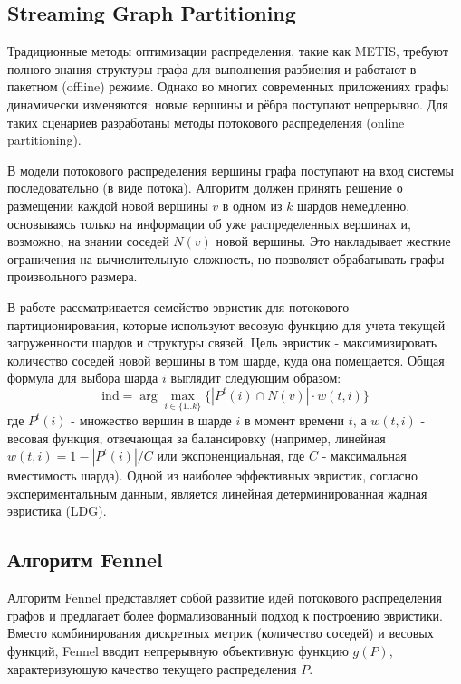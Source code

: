 \subsection{Streaming Graph Partitioning}

Традиционные методы оптимизации распределения, такие как METIS, требуют полного знания структуры графа для выполнения разбиения и работают в пакетном (offline) режиме. Однако во многих современных приложениях графы динамически изменяются: новые вершины и рёбра поступают непрерывно. Для таких сценариев разработаны методы потокового распределения (online partitioning).

В модели потокового распределения \cite{SGP} вершины графа поступают на вход системы последовательно (в виде потока). Алгоритм должен принять решение о размещении каждой новой вершины \(v\) в одном из \(k\) шардов немедленно, основываясь только на информации об уже распределенных вершинах и, возможно, на знании соседей \(N(v)\) новой вершины. Это накладывает жесткие ограничения на вычислительную сложность, но позволяет обрабатывать графы произвольного размера.

В работе \cite{SGP} рассматривается семейство эвристик для потокового партиционирования, которые используют весовую функцию для учета текущей загруженности шардов и структуры связей. Цель эвристик - максимизировать количество соседей новой вершины в том шарде, куда она помещается. Общая формула для выбора шарда \(i\) выглядит следующим образом:
$$
\text{ind} = \arg\max_{i \in \{1..k\}} \{ |P^t(i) \cap N(v)| \cdot w(t, i) \}
$$
где \(P^t(i)\) - множество вершин в шарде \(i\) в момент времени \(t\), а \(w(t, i)\) - весовая функция, отвечающая за балансировку (например, линейная \(w(t, i) = 1 - |P^t(i)| / C\) или экспоненциальная, где \(C\) - максимальная вместимость шарда). Одной из наиболее эффективных эвристик, согласно экспериментальным данным, является линейная детерминированная жадная эвристика (LDG).

\subsection{Алгоритм Fennel}

Алгоритм Fennel \cite{Fennel} представляет собой развитие идей потокового распределения графов и предлагает более формализованный подход к построению эвристики. Вместо комбинирования дискретных метрик (количество соседей) и весовых функций, Fennel вводит непрерывную объективную функцию \(g(P)\), характеризующую качество текущего распределения \(P\).


